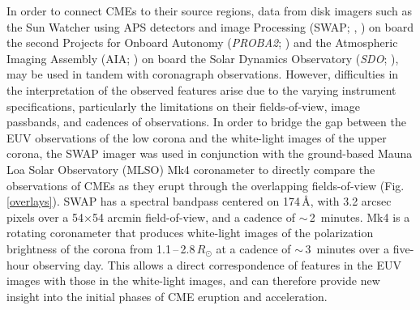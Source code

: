 \documentclass[namedreferences]{solarphysics}
\begin{document}
\begin{article}
In order to connect CMEs to their source regions, data from disk imagers such as the Sun Watcher using APS detectors and image Processing (SWAP; , ) on board the second Projects for Onboard Autonomy (\emph{PROBA2}; ) and the Atmospheric Imaging Assembly (AIA; ) on board the Solar Dynamics Observatory (\emph{SDO}; ), may be used in tandem with coronagraph observations. However, difficulties in the interpretation of the observed features arise due to the varying instrument specifications, particularly the limitations on their fields-of-view, image passbands, and cadences of observations. In order to bridge the gap between the EUV observations of the low corona and the white-light images of the upper corona, the SWAP imager was used in conjunction with the ground-based Mauna Loa Solar Observatory (MLSO) Mk4 coronameter \cite{2003SPIE.4843...66E} to directly compare the observations of CMEs as they erupt through the overlapping fields-of-view (Fig.\,\ref{overlays}). SWAP has a spectral bandpass centered on 174\,{\AA}, with 3.2 arcsec pixels over a 54$\times$54 arcmin field-of-view, and a cadence of $\sim$\,2~minutes. Mk4 is a rotating coronameter that produces white-light images of the polarization brightness of the corona from 1.1\,--\,2.8\,$R_{\odot}$ at a cadence of $\sim$\,3~minutes over a five-hour observing day. This allows a direct correspondence of features in the EUV images with those in the white-light images, and can therefore provide new insight into the initial phases of CME eruption and acceleration.


\end{article}
\end{document}
